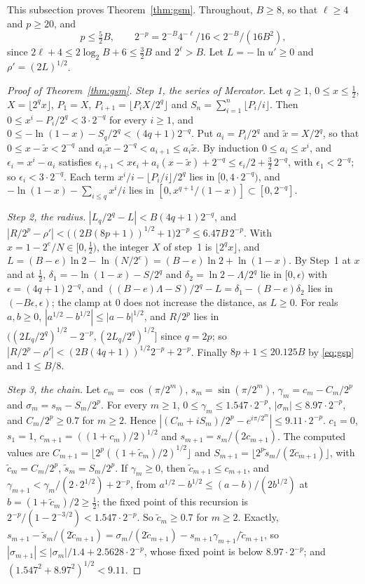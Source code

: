 \documentclass[11pt]{amsart}
\theoremstyle{definition}
\numberwithin{equation}{section}
\begin{document}
This subsection proves Theorem~\ref{thm:gsm}. Throughout, $B\ge8$, so that $\ell\ge4$ and $p\ge20$, and
\begin{equation}\label{eq:gsp}
p\le\tfrac52B,\qquad2^{-p}=2^{-B}4^{-\ell}/16<2^{-B}/(16B^2),
\end{equation}
since $2\ell+4\le2\log_2B+6\le\frac32B$ and $2^\ell>B$. Let $L=-\ln u'\ge0$ and $\rho'=(2L)^{1/2}$.

\begin{proof}[Proof of Theorem~\ref{thm:gsm}]
\emph{Step 1, the series of Mercator.} Let $q\ge1$, $0\le x\le\frac12$, $X=\lfloor2^qx\rfloor$, $P_1=X$, $P_{i+1}=\lfloor P_iX/2^q\rfloor$ and $S_n=\sum_{i=1}^n\lfloor P_i/i\rfloor$. Then $0\le x^i-P_i/2^q<3\cdot2^{-q}$ for every $i\ge1$, and $0\le-\ln(1-x)-S_q/2^q<(4q+1)2^{-q}$.
Put $a_i=P_i/2^q$ and $\tilde x=X/2^q$, so that $0\le x-\tilde x<2^{-q}$ and $a_i\tilde x-2^{-q}<a_{i+1}\le a_i\tilde x$. By induction $0\le a_i\le x^i$, and $\epsilon_i=x^i-a_i$ satisfies $\epsilon_{i+1}<x\epsilon_i+a_i(x-\tilde x)+2^{-q}\le\epsilon_i/2+\frac32\,2^{-q}$, with $\epsilon_1<2^{-q}$; so $\epsilon_i<3\cdot2^{-q}$. Each term $x^i/i-\lfloor P_i/i\rfloor/2^q$ lies in $[0,4\cdot2^{-q})$, and $-\ln(1-x)-\sum_{i\le q}x^i/i$ lies in $[0,x^{q+1}/(1-x)]\subset[0,2^{-q}]$.

\emph{Step 2, the radius.} $|L_q/2^q-L|<B(4q+1)2^{-q}$, and $|R/2^p-\rho'|<\bigl((2B(8p+1))^{1/2}+1\bigr)2^{-p}\le6.47B\,2^{-p}$.
With $x=1-2^e/N\in[0,\frac12)$, the integer $X$ of step~1 is $\lfloor2^qx\rfloor$, and $L=(B-e)\ln2-\ln(N/2^e)=(B-e)\ln2+\ln(1-x)$. By Step~1 at $x$ and at $\frac12$, $\delta_1=-\ln(1-x)-S/2^q$ and $\delta_2=\ln2-\Lambda/2^q$ lie in $[0,\epsilon)$ with $\epsilon=(4q+1)2^{-q}$, and $((B-e)\Lambda-S)/2^q-L=\delta_1-(B-e)\delta_2$ lies in $(-B\epsilon,\epsilon)$; the clamp at $0$ does not increase the distance, as $L\ge0$. For reals $a,b\ge0$, $|a^{1/2}-b^{1/2}|\le|a-b|^{1/2}$, and $R/2^p$ lies in $\bigl((2L_q/2^q)^{1/2}-2^{-p},(2L_q/2^q)^{1/2}\bigr]$ since $q=2p$; so $|R/2^p-\rho'|<(2B(4q+1))^{1/2}2^{-p}+2^{-p}$. Finally $8p+1\le20.125B$ by \eqref{eq:gsp} and $1\le B/8$.

\emph{Step 3, the chain.} Let $c_m=\cos(\pi/2^m)$, $s_m=\sin(\pi/2^m)$, $\gamma_m=c_m-C_m/2^p$ and $\sigma_m=s_m-S_m/2^p$. For every $m\ge1$, $0\le\gamma_m\le1.547\cdot2^{-p}$, $|\sigma_m|\le8.97\cdot2^{-p}$, and $C_m/2^p\ge0.7$ for $m\ge2$. Hence $|(C_m+iS_m)/2^p-e^{i\pi/2^m}|\le9.11\cdot2^{-p}$.
$c_1=0$, $s_1=1$, $c_{m+1}=((1+c_m)/2)^{1/2}$ and $s_{m+1}=s_m/(2c_{m+1})$. The computed values are $C_{m+1}=\lfloor2^p((1+\tilde c_m)/2)^{1/2}\rfloor$ and $S_{m+1}=\lfloor2^p\tilde s_m/(2\tilde c_{m+1})\rfloor$, with $\tilde c_m=C_m/2^p$, $\tilde s_m=S_m/2^p$. If $\gamma_m\ge0$, then $\tilde c_{m+1}\le c_{m+1}$, and $\gamma_{m+1}<\gamma_m/(2\cdot2^{1/2})+2^{-p}$, from $a^{1/2}-b^{1/2}\le(a-b)/(2b^{1/2})$ at $b=(1+\tilde c_m)/2\ge\frac12$; the fixed point of this recursion is $2^{-p}/(1-2^{-3/2})<1.547\cdot2^{-p}$. So $\tilde c_m\ge0.7$ for $m\ge2$. Exactly, $s_{m+1}-\tilde s_m/(2\tilde c_{m+1})=\sigma_m/(2\tilde c_{m+1})-s_{m+1}\gamma_{m+1}/\tilde c_{m+1}$, so $|\sigma_{m+1}|\le|\sigma_m|/1.4+2.5628\cdot2^{-p}$, whose fixed point is below $8.97\cdot2^{-p}$; and $(1.547^2+8.97^2)^{1/2}<9.11$.


\end{proof}
\end{document}
